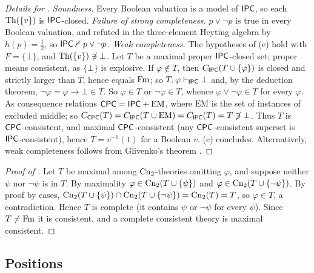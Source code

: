 \begin{proof}[Details for ]
\emph{Soundness.} Every Boolean valuation is a model of $\mathsf{IPC}$, so each $\mathrm{Th}(\{v\})$ is $\mathsf{IPC}$-closed. \emph{Failure of strong completeness.} $p\vee\neg p$ is true in every Boolean valuation, and refuted in the three-element Heyting algebra by $h(p)=\frac12$, so $\mathsf{IPC}\nvdash p\vee\neg p$. \emph{Weak completeness.} The hypotheses of (c) hold with $F=\{\bot\}$, and $\mathrm{Th}(\{v\})\not\ni\bot$. Let $T$ be a maximal proper $\mathsf{IPC}$-closed set; proper means consistent, as $\{\bot\}$ is explosive. If $\varphi\notin T$, then $C_{\mathsf{IPC}}(T\cup\{\varphi\})$ is closed and strictly larger than $T$, hence equals $\mathrm{Fm}$; so $T,\varphi\vdash_{\mathsf{IPC}}\bot$ and, by the deduction theorem, $\neg\varphi=\varphi\to\bot\in T$. So $\varphi\in T$ or $\neg\varphi\in T$, whence $\varphi\vee\neg\varphi\in T$ for every $\varphi$. As consequence relations $\mathsf{CPC}=\mathsf{IPC}+\mathrm{EM}$, where $\mathrm{EM}$ is the set of instances of excluded middle; so $C_{\mathsf{CPC}}(T)=C_{\mathsf{IPC}}(T\cup\mathrm{EM})=C_{\mathsf{IPC}}(T)=T\not\ni\bot$. Thus $T$ is $\mathsf{CPC}$-consistent, and maximal $\mathsf{CPC}$-consistent (any $\mathsf{CPC}$-consistent superset is $\mathsf{IPC}$-consistent), hence $T=v^{-1}(1)$ for a Boolean $v$. (c) concludes. Alternatively, weak completeness follows from Glivenko's theorem \citep{glivenko1929quelques}.
\end{proof}

\begin{proof}[Proof of ]
Let $T$ be maximal among $\mathrm{Cn}_2$-theories omitting $\varphi$, and suppose neither $\psi$ nor $\neg\psi$ is in $T$. By maximality $\varphi\in\mathrm{Cn}_2(T\cup\{\psi\})$ and $\varphi\in\mathrm{Cn}_2(T\cup\{\neg\psi\})$. By proof by cases, $\mathrm{Cn}_2(T\cup\{\psi\})\cap\mathrm{Cn}_2(T\cup\{\neg\psi\})=\mathrm{Cn}_2(T)=T$, so $\varphi\in T$, a contradiction. Hence $T$ is complete (it contains $\psi$ or $\neg\psi$ for every $\psi$). Since $T\neq\mathrm{Fm}$ it is consistent, and a complete consistent theory is maximal consistent.
\end{proof}

\subsection{Positions}\label{app:existence:positions}

